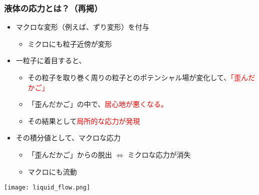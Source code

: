 \documentclass[12pt, dvipdfmx]{beamer}
\begin{document}
\begin{frame}
	\frametitle{液体の応力とは？（再掲）}
		\begin{itemize}
			\item マクロな変形（例えば、ずり変形）を付与
			\begin{itemize}
				\item ミクロにも粒子近傍が変形
			\end{itemize}
			\item 一粒子に着目すると、
			\begin{itemize}
				\item その粒子を取り巻く周りの粒子とのポテンシャル場が変化して、\textcolor{red}{「歪んだかご」}
				\item 「歪んだかご」の中で、\textcolor{red}{居心地が悪くなる。}
				\item その結果として\textcolor{red}{局所的な応力が発現}
			\end{itemize}
			\item その積分値として、マクロな応力
			\begin{itemize}
				\item 「歪んだかご」からの\alert{脱出 $\Leftrightarrow$ ミクロな応力が消失 }
				\item マクロにも\alert{流動}
			\end{itemize}
		\end{itemize}
		\vspace{3mm}
		\begin{center}
			\texttt{[image: liquid\_flow.png]}
		\end{center}
\end{frame}
\end{document}

